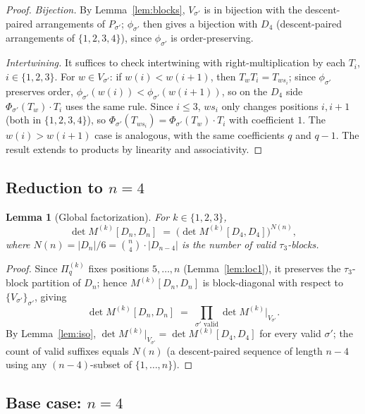 \documentclass[11pt]{article}
\newtheorem{lemma}[theorem]{Lemma}
\theoremstyle{definition}
\begin{document}
\begin{proof}
\emph{Bijection.} By Lemma~\ref{lem:blocks}, $V_{\sigma'}$ is in bijection with the
descent-paired arrangements of $P_{\sigma'}$; $\phi_{\sigma'}$ then gives a bijection
with $D_4$ (descent-paired arrangements of $\{1,2,3,4\}$), since $\phi_{\sigma'}$ is
order-preserving.

\emph{Intertwining.} It suffices to check intertwining with right-multiplication by each
$T_i$, $i \in \{1, 2, 3\}$. For $w \in V_{\sigma'}$:
if $w(i) < w(i+1)$, then $T_w T_i = T_{ws_i}$; since $\phi_{\sigma'}$ preserves order,
$\phi_{\sigma'}(w(i)) < \phi_{\sigma'}(w(i+1))$, so on the $D_4$ side
$\Phi_{\sigma'}(T_w) \cdot T_i$ uses the same rule. Since $i \leq 3$, $ws_i$ only changes
positions $i, i+1$ (both in $\{1,2,3,4\}$), so
$\Phi_{\sigma'}(T_{ws_i}) = \Phi_{\sigma'}(T_w) \cdot T_i$ with coefficient $1$. The
$w(i) > w(i+1)$ case is analogous, with the same coefficients $q$ and $q-1$. The result
extends to products by linearity and associativity.
\end{proof}

\subsection{Reduction to $n = 4$}

\begin{lemma}[Global factorization]
\label{lem:global}
For $k \in \{1, 2, 3\}$,
\[
\det M^{(k)}[D_n, D_n] \;=\; \bigl(\det M^{(k)}[D_4, D_4]\bigr)^{N(n)},
\]
where $N(n) = |D_n|/6 = \binom{n}{4} \cdot |D_{n-4}|$ is the number of valid $\tau_3$-blocks.
\end{lemma}

\begin{proof}
Since $\Pi^{(k)}_q$ fixes positions $5, \ldots, n$ (Lemma~\ref{lem:loc1}), it preserves the
$\tau_3$-block partition of $D_n$; hence $M^{(k)}[D_n, D_n]$ is block-diagonal with respect
to $\{V_{\sigma'}\}_{\sigma'}$, giving
\[
\det M^{(k)}[D_n, D_n] \;=\; \prod_{\sigma' \text{ valid}} \det M^{(k)}\bigl|_{V_{\sigma'}}.
\]
By Lemma~\ref{lem:iso}, $\det M^{(k)}|_{V_{\sigma'}} = \det M^{(k)}[D_4, D_4]$ for every
valid $\sigma'$; the count of valid suffixes equals $N(n)$ (a descent-paired sequence of
length $n - 4$ using any $(n-4)$-subset of $\{1,\ldots,n\}$).
\end{proof}

\subsection{Base case: $n = 4$}
\end{document}
